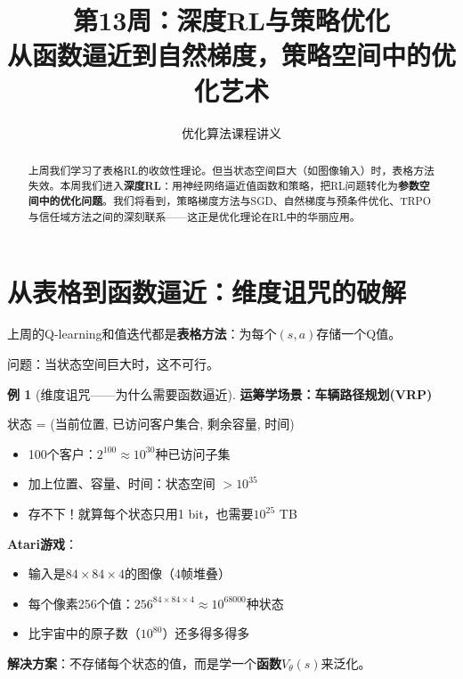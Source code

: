 \documentclass[11pt,a4paper]{article}
\title{\textbf{第13周：深度RL与策略优化} \\[0.5em]
\large 从函数逼近到自然梯度，策略空间中的优化艺术}
\author{优化算法课程讲义}
\date{}
\theoremstyle{definition}
\newtheorem{example}{例}[section]
\begin{document}
\maketitle

\begin{abstract}
上周我们学习了表格RL的收敛性理论。但当状态空间巨大（如图像输入）时，表格方法失效。本周我们进入\textbf{深度RL}：用神经网络逼近值函数和策略，把RL问题转化为\textbf{参数空间中的优化问题}。我们将看到，策略梯度方法与SGD、自然梯度与预条件优化、TRPO与信任域方法之间的深刻联系——这正是优化理论在RL中的华丽应用。
\end{abstract}

\tableofcontents
\newpage

\section{从表格到函数逼近：维度诅咒的破解}

\begin{plainwords}[回顾上周的局限]
上周的Q-learning和值迭代都是\textbf{表格方法}：为每个$(s,a)$存储一个Q值。

问题：当状态空间巨大时，这不可行。
\end{plainwords}

\begin{example}[维度诅咒——为什么需要函数逼近]
\textbf{运筹学场景：车辆路径规划(VRP)}

状态 = (当前位置, 已访问客户集合, 剩余容量, 时间)

\begin{itemize}
    \item 100个客户：$2^{100} \approx 10^{30}$种已访问子集
    \item 加上位置、容量、时间：状态空间 $> 10^{35}$
    \item 存不下！就算每个状态只用1 bit，也需要$10^{25}$ TB
\end{itemize}

\textbf{Atari游戏}：
\begin{itemize}
    \item 输入是$84 \times 84 \times 4$的图像（4帧堆叠）
    \item 每个像素256个值：$256^{84 \times 84 \times 4} \approx 10^{68000}$种状态
    \item 比宇宙中的原子数（$10^{80}$）还多得多得多
\end{itemize}

\textbf{解决方案}：不存储每个状态的值，而是学一个\textbf{函数}$V_\theta(s)$来泛化。
\end{example}
\end{document}
